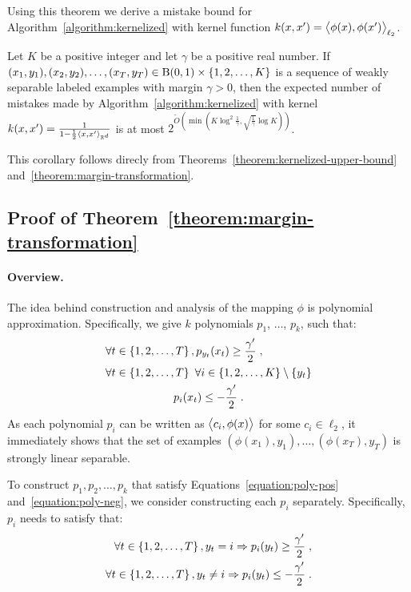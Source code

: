 Using this theorem we derive a mistake bound for
Algorithm~\ref{algorithm:kernelized} with kernel function $k(x,x') =
\left\langle \phi(x), \phi(x') \right\rangle_{\ell_2}$.

\begin{corollary}
\label{corollary:weakly-separable-examples-mistake-upper-bound}
Let $K$ be a positive integer and let $\gamma$ be a positive real number. If
$(x_1, y_1), (x_2, y_2), \dots, (x_T, y_T) \in \operatorname{B}(0,1) \times \{1,2,\dots,K\}$
is a sequence of weakly separable labeled examples with margin $\gamma > 0$,
then the expected number of mistakes made by Algorithm~\ref{algorithm:kernelized}
with kernel $k(x,x') = \frac{1}{1 - \frac{1}{2}\left\langle x, x' \right\rangle_{\mathbb{R}^d}}$
is at most $2^{\widetilde{O}(\min(K \log^2 \frac{1}{\gamma},
\sqrt{\frac{1}{\gamma}} \log K))}$.
\end{corollary}

This corollary follows direcly from
Theorems~\ref{theorem:kernelized-upper-bound}
and~\ref{theorem:margin-transformation}.

\subsection{Proof of Theorem~\ref{theorem:margin-transformation}}
\label{section:margin-transformation}

\paragraph{Overview.} The idea behind construction and analysis of the mapping
$\phi$ is polynomial approximation. Specifically, we give $k$ polynomials $p_1$,
$\ldots$, $p_k$, such that:
\begin{align}
\label{equation:poly-pos}
& \forall t \in \cbr{1,2,\dots,T}, p_{y_t}(x_t) \ge \frac{\gamma'}2 \; ,
\\
\label{equation:poly-neg}
& \begin{gathered}
\forall t \in \cbr{1,2,\dots,T} \ \forall i \in \cbr{1,2,\ldots,K} \setminus \cbr{y_t} \\
p_i(x_t) \leq -\frac{\gamma'}2 \; .
\end{gathered}
\end{align}
As each polynomial $p_i$ can be written as $\left\langle c_i, \phi(x) \right\rangle$ for some $c_i \in
\ell_2$, it immediately shows that the set of examples $(\phi(x_1),y_1), \ldots,
(\phi(x_T),y_T)$ is strongly linear separable.

To construct $p_1, p_2, \dots, p_k$ that satisfy
Equations~\eqref{equation:poly-pos} and~\eqref{equation:poly-neg}, we consider
constructing each $p_i$ separately. Specifically, $p_i$ needs to satisfy that:
\begin{align}
\label{equation:poly-pos-i}
\forall t \in \cbr{1,2,\dots,T}, y_t = i \Rightarrow p_i(y_t) \ge \frac{\gamma'}2 \; , \\
\label{equation:poly-neg-i}
\forall t \in \cbr{1,2,\dots,T}, y_t \neq i \Rightarrow p_i(y_t) \le -\frac{\gamma'}2 \; .
\end{align}


